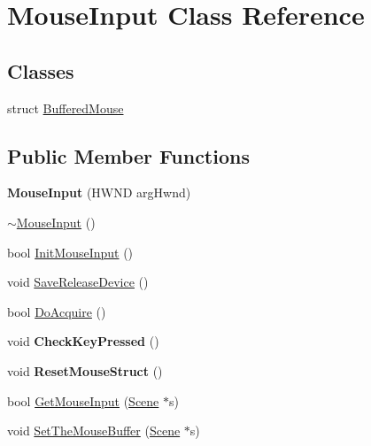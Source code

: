 \hypertarget{class_mouse_input}{\section{Mouse\-Input Class Reference}
\label{class_mouse_input}
}
\subsection*{Classes}
\begin{DoxyCompactItemize}
\item 
struct \hyperlink{struct_mouse_input_1_1_buffered_mouse}{Buffered\-Mouse}
\end{DoxyCompactItemize}
\subsection*{Public Member Functions}
\begin{DoxyCompactItemize}
\item 
\hypertarget{class_mouse_input_aeabc11fe09090864866104a909819530}{{\bfseries Mouse\-Input} (H\-W\-N\-D arg\-Hwnd)}\label{class_mouse_input_aeabc11fe09090864866104a909819530}

\item 
\hyperlink{class_mouse_input_a2ae61cf479be0245aee4a8fef4b05e90}{$\sim$\-Mouse\-Input} ()
\item 
bool \hyperlink{class_mouse_input_a26070c27b182194a1f12308b80e90969}{Init\-Mouse\-Input} ()
\item 
void \hyperlink{class_mouse_input_a6ddf45aec3e8a27c81ccf6f164361346}{Save\-Release\-Device} ()
\item 
bool \hyperlink{class_mouse_input_a336bb5a74324ba0ad9909dd59a3e7c19}{Do\-Acquire} ()
\item 
\hypertarget{class_mouse_input_a58dd79ad7c893665d36b167c5f1c8928}{void {\bfseries Check\-Key\-Pressed} ()}\label{class_mouse_input_a58dd79ad7c893665d36b167c5f1c8928}

\item 
\hypertarget{class_mouse_input_a9d072821a38341f1729b40820af1c254}{void {\bfseries Reset\-Mouse\-Struct} ()}\label{class_mouse_input_a9d072821a38341f1729b40820af1c254}

\item 
bool \hyperlink{class_mouse_input_a7e06109468bcb801260cbff1d9ade09b}{Get\-Mouse\-Input} (\hyperlink{class_scene}{Scene} $\ast$s)
\item 
void \hyperlink{class_mouse_input_ab263b4658f8c9852d7a4d40ba6e5064a}{Set\-The\-Mouse\-Buffer} (\hyperlink{class_scene}{Scene} $\ast$s)
\end{DoxyCompactItemize}


